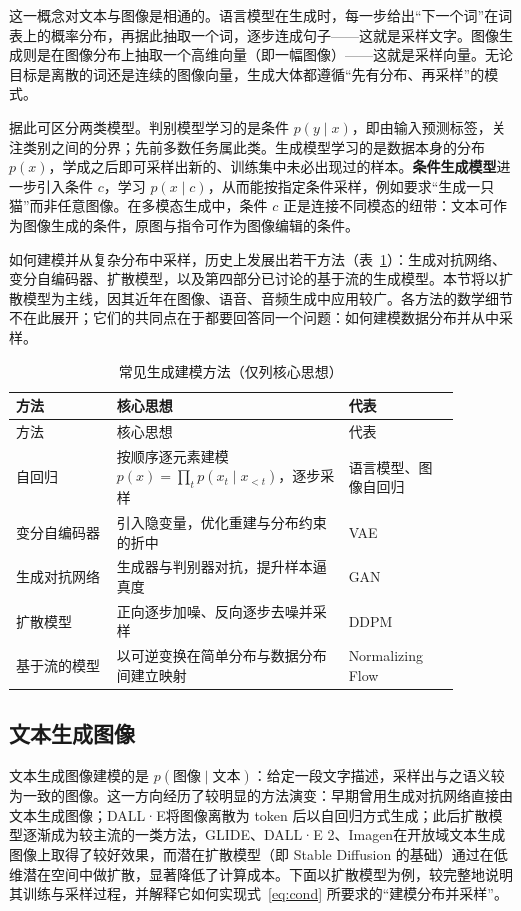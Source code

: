 这一概念对文本与图像是相通的。语言模型在生成时，每一步给出“下一个词”在词表上的概率分布，再据此抽取一个词，逐步连成句子——这就是采样文字。图像生成则是在图像分布上抽取一个高维向量（即一幅图像）——这就是采样向量。无论目标是离散的词还是连续的图像向量，生成大体都遵循“先有分布、再采样”的模式。

据此可区分两类模型。判别模型学习的是条件 $p(y\mid x)$，即由输入预测标签，关注类别之间的分界；先前多数任务属此类。生成模型学习的是数据本身的分布 $p(x)$，学成之后即可采样出新的、训练集中未必出现过的样本。\textbf{条件生成模型}进一步引入条件 $c$，学习 $p(x\mid c)$，从而能按指定条件采样，例如要求“生成一只猫”而非任意图像。在多模态生成中，条件 $c$ 正是连接不同模态的纽带：文本可作为图像生成的条件，原图与指令可作为图像编辑的条件。

如何建模并从复杂分布中采样，历史上发展出若干方法（表~\ref{tab:genfamily}）：生成对抗网络\cite{gan}、变分自编码器\cite{vae}、扩散模型\cite{ddpm}，以及第四部分已讨论的基于流的生成模型。本节将以扩散模型为主线，因其近年在图像、语音、音频生成中应用较广。各方法的数学细节不在此展开；它们的共同点在于都要回答同一个问题：如何建模数据分布并从中采样。

\begin{longtable}{p{0.20\linewidth}p{0.46\linewidth}p{0.22\linewidth}}
  \caption{常见生成建模方法（仅列核心思想）}\label{tab:genfamily}\\
  \toprule
  方法 & 核心思想 & 代表 \\
  \midrule
  \endfirsthead
  \toprule
  方法 & 核心思想 & 代表 \\
  \midrule
  \endhead
  自回归 & 按顺序逐元素建模 $p(x)=\prod_t p(x_t\mid x_{<t})$，逐步采样 & 语言模型、图像自回归 \\
  变分自编码器 & 引入隐变量，优化重建与分布约束的折中 & VAE \\
  生成对抗网络 & 生成器与判别器对抗，提升样本逼真度 & GAN \\
  扩散模型 & 正向逐步加噪、反向逐步去噪并采样 & DDPM \\
  基于流的模型 & 以可逆变换在简单分布与数据分布间建立映射 & Normalizing Flow \\
  \bottomrule
\end{longtable}

\subsection{文本生成图像}
\label{sub:t2i}

文本生成图像建模的是 $p(\text{图像}\mid\text{文本})$：给定一段文字描述，采样出与之语义较为一致的图像。这一方向经历了较明显的方法演变：早期曾用生成对抗网络直接由文本生成图像；DALL·E\cite{dalle}将图像离散为 token 后以自回归方式生成；此后扩散模型逐渐成为较主流的一类方法，GLIDE\cite{glide}、DALL·E 2\cite{dalle2}、Imagen\cite{imagen}在开放域文本生成图像上取得了较好效果，而潜在扩散模型\cite{ldm}（即 Stable Diffusion 的基础）通过在低维潜在空间中做扩散，显著降低了计算成本。下面以扩散模型为例，较完整地说明其训练与采样过程，并解释它如何实现式~\eqref{eq:cond} 所要求的“建模分布并采样”。

